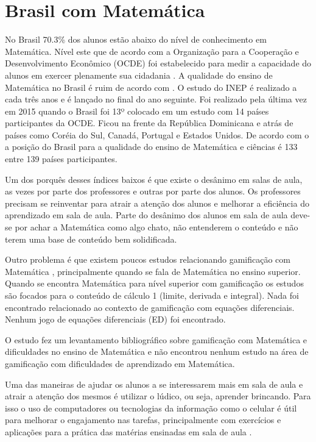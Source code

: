 
\section[Brasil com Matemática]{Brasil com Matemática}
No Brasil 70.3\% dos alunos estão abaixo do nível de conhecimento em Matemática. Nível este que de acordo com a Organização para a Cooperação e Desenvolvimento Econômico (OCDE) foi estabelecido para medir a capacidade do alunos em exercer plenamente sua cidadania \cite{inep2015nivelcidadania}. A qualidade do ensino de Matemática no Brasil é ruim de acordo com \cite{inep2015}. O estudo do INEP é realizado a cada três anos e é lançado no final do ano seguinte. Foi realizado pela última vez em 2015 quando o Brasil foi 13º colocado em um estudo com 14 países participantes da OCDE. Ficou na frente da República Dominicana e atrás de países como Coréia do Sul, Canadá, Portugal e Estados Unidos. De acordo com o \cite{indiceRuimMat} a posição do Brasil para a qualidade do ensino de Matemática e ciências é 133 entre 139 países participantes.

Um dos porquês desses índices baixos é que existe o desânimo em salas de aula, as vezes por parte dos professores e outras por parte dos alunos. Os professores precisam se reinventar para atrair a atenção dos alunos e melhorar a eficiência do aprendizado em sala de aula. Parte do desânimo dos alunos em sala de aula deve-se por achar a Matemática como algo chato, não entenderem o conteúdo e não terem uma base de conteúdo bem solidificada.

Outro problema é que existem poucos estudos relacionando gamificação com Matemática \cite{revbibmatgam}, principalmente quando se fala de Matemática no ensino superior. Quando se encontra Matemática para nível superior com gamificação os estudos são focados para o conteúdo de cálculo 1 (limite, derivada e integral). Nada foi encontrado relacionado ao contexto de gamificação com equações diferenciais. Nenhum jogo de equações diferenciais (ED) foi encontrado.

O estudo \cite{revbibmatgam} fez um levantamento bibliográfico sobre gamificação com Matemática e dificuldades no ensino de Matemática e não encontrou nenhum estudo na área de gamificação com dificuldades de aprendizado em Matemática. 

Uma das maneiras de ajudar os alunos a se interessarem mais em sala de aula e atrair a atenção dos mesmos é utilizar o lúdico, ou seja, aprender brincando. Para isso o uso de computadores ou tecnologias da informação como o celular é útil para melhorar o engajamento nas tarefas, principalmente com exercícios e aplicações para a prática das matérias ensinadas em sala de aula \cite{tdahNasEscolas2}.